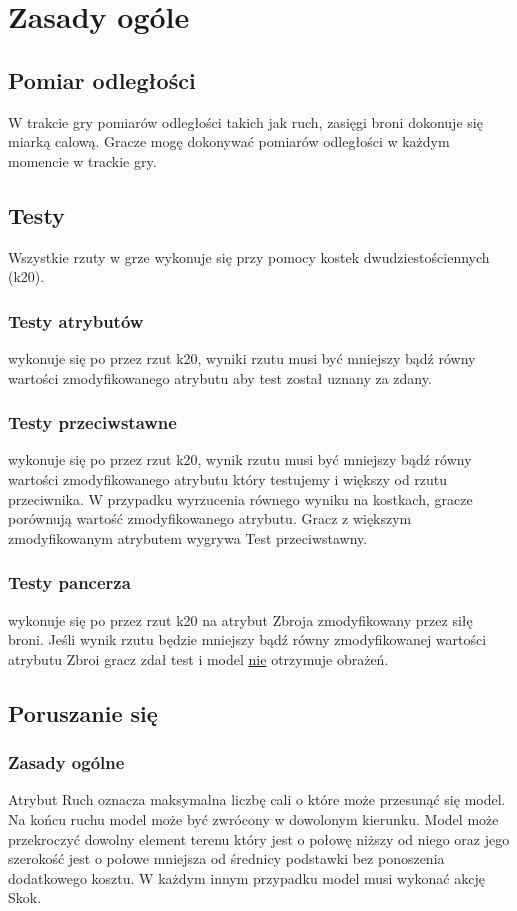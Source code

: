 \chapter{Zasady ogóle}

\section{Pomiar odległości}
W trakcie gry pomiarów odległości takich jak ruch, zasięgi broni dokonuje się miarką calową. Gracze mogę dokonywać pomiarów odległości w każdym momencie w trackie gry. 

\section{Testy}

Wszystkie rzuty w grze wykonuje się przy pomocy kostek dwudziestościennych (k20).

\subsection{Testy atrybutów} wykonuje się po przez rzut k20, wyniki rzutu musi być mniejszy bądź równy wartości zmodyfikowanego atrybutu aby test został uznany za zdany. 

\subsection{Testy przeciwstawne} wykonuje się po przez rzut k20, wynik rzutu musi być mniejszy bądź równy wartości zmodyfikowanego atrybutu który testujemy i większy od rzutu przeciwnika. W przypadku wyrzucenia równego wyniku na kostkach, gracze porównują wartość zmodyfikowanego atrybutu. Gracz z większym zmodyfikowanym atrybutem wygrywa Test przeciwstawny. 
\subsection{Testy pancerza} wykonuje się po przez rzut k20 na atrybut Zbroja zmodyfikowany przez siłę broni. Jeśli wynik rzutu będzie mniejszy bądź równy zmodyfikowanej wartości atrybutu Zbroi gracz zdał test i model \underline{nie} otrzymuje obrażeń.


\section{Poruszanie się}
\subsection{Zasady ogólne}
Atrybut Ruch oznacza maksymalna liczbę cali o które może przesunąć się model. Na końcu ruchu model może być zwrócony w dowolonym kierunku. Model może przekroczyć dowolny element terenu który jest o połowę niższy od niego oraz jego szerokość jest o połowe mniejsza od średnicy podstawki bez ponoszenia dodatkowego kosztu. W każdym innym przypadku model musi wykonać akcję Skok. 
